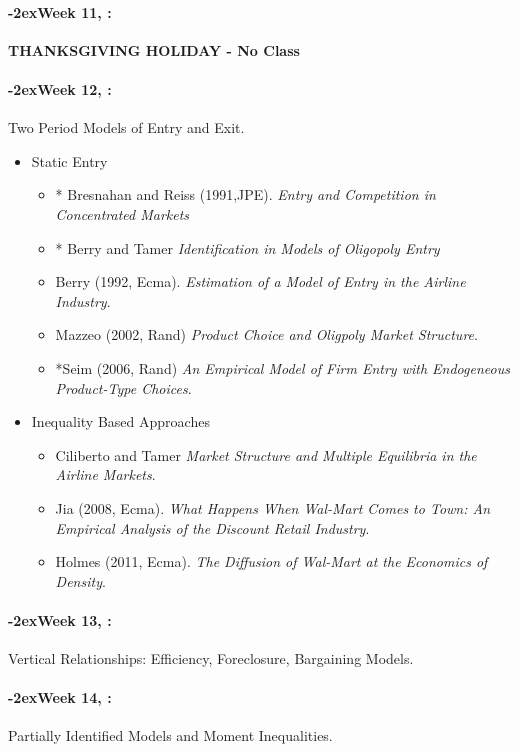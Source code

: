 \documentclass[11pt]{article}
\newcommand{\week}[1]{%
  \paragraph*{\kern-2ex\quad #1, \syldate{\today}:}%
  \ifdim\wd1=\wd\THURSDAY
    \AdvanceDate[7]
  \else
    \AdvanceDate[7]
  \fi%
}
\begin{document}
\week{Week 11} \textbf{THANKSGIVING HOLIDAY - No Class}


\week{Week 12} Two Period Models of Entry and Exit.
\begin{itemize}
\item Static Entry
\begin{itemize}
\item * Bresnahan and Reiss (1991,JPE). \textit{Entry and Competition in Concentrated Markets}
\item * Berry and Tamer \textit{Identification in Models of Oligopoly Entry}
\item Berry (1992, Ecma). \textit{Estimation of a Model of Entry in the Airline Industry}.
\item Mazzeo (2002, Rand) \textit{Product Choice and Oligpoly Market Structure}.
\item *Seim (2006, Rand) \textit{ An Empirical Model of Firm Entry with Endogeneous Product-Type Choices}.
\end{itemize}
\item Inequality Based Approaches
\begin{itemize}
\item Ciliberto and Tamer \textit{Market Structure and Multiple Equilibria in the Airline Markets}.
\item Jia (2008, Ecma). \textit{What Happens When Wal-Mart Comes to Town: An Empirical Analysis of the Discount Retail Industry}.
\item Holmes (2011, Ecma). \textit{The Diffusion of Wal-Mart at the Economics of Density}.
\end{itemize}
\end{itemize}

\week{Week 13} Vertical Relationships: Efficiency, Foreclosure, Bargaining Models.
\week{Week 14} Partially Identified Models and Moment Inequalities.
\end{document}
